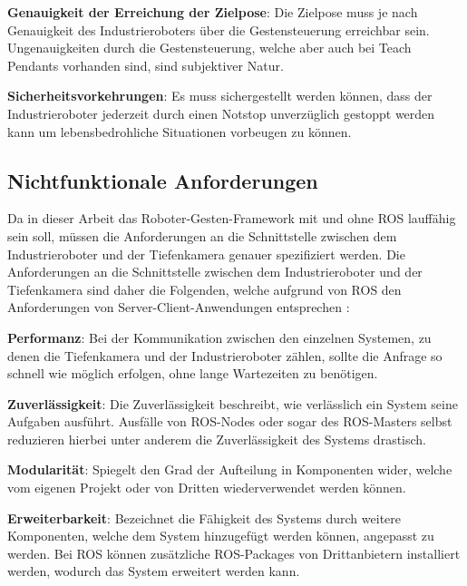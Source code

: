 \begin{compactitem}
    \item \textbf{Genauigkeit der Erreichung der Zielpose}: Die Zielpose muss je nach Genauigkeit des Industrieroboters über die Gestensteuerung erreichbar sein. Ungenauigkeiten durch die Gestensteuerung, welche aber auch bei Teach Pendants vorhanden sind, sind subjektiver Natur.
    \item \textbf{Sicherheitsvorkehrungen}: Es muss sichergestellt werden können, dass der Industrieroboter jederzeit durch einen Notstop unverzüglich gestoppt werden kann um lebensbedrohliche Situationen vorbeugen zu können.
\end{compactitem}

\subsection{Nichtfunktionale Anforderungen}
Da in dieser Arbeit das Roboter-Gesten-Framework mit und ohne ROS lauffähig sein soll, müssen die Anforderungen an die Schnittstelle zwischen dem Industrieroboter und der Tiefenkamera genauer spezifiziert werden. Die Anforderungen an die Schnittstelle zwischen dem Industrieroboter und der Tiefenkamera sind daher die Folgenden, welche aufgrund von ROS den Anforderungen von Server-Client-Anwendungen entsprechen \cite{osterrieder_komponentenmodelle_2004}:\\

\begin{compactitem}
    \item \textbf{Performanz}: Bei der Kommunikation zwischen den einzelnen Systemen, zu denen die Tiefenkamera und der Industrieroboter zählen, sollte die Anfrage so schnell wie möglich erfolgen, ohne lange Wartezeiten zu benötigen.
    \item \textbf{Zuverlässigkeit}: Die Zuverlässigkeit beschreibt, wie verlässlich ein System seine Aufgaben ausführt. Ausfälle von ROS-Nodes oder sogar des ROS-Masters selbst reduzieren hierbei unter anderem die Zuverlässigkeit des Systems drastisch.
    \item \textbf{Modularität}: Spiegelt den Grad der Aufteilung in Komponenten wider, welche vom eigenen Projekt oder von Dritten wiederverwendet werden können.
    \item \textbf{Erweiterbarkeit}: Bezeichnet die Fähigkeit des Systems durch weitere Komponenten, welche dem System hinzugefügt werden können, angepasst zu werden. Bei ROS können zusätzliche ROS-Packages von Drittanbietern installiert werden, wodurch das System erweitert werden kann.
\end{compactitem}

